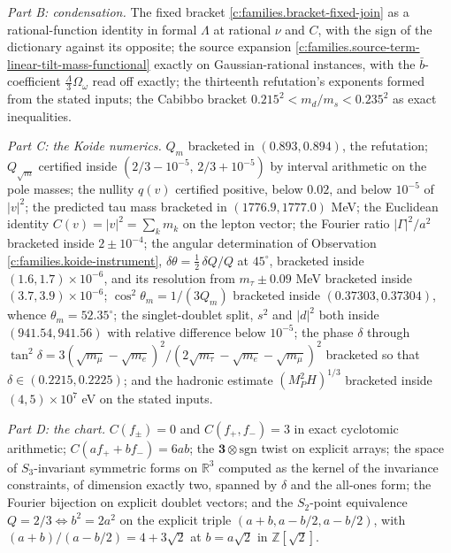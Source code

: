 \documentclass[11pt]{article}
\theoremstyle{definition}
\theoremstyle{plain}
\providecommand{\R}{}\renewcommand{\R}{\mathbb{R}}
\begin{document}
\emph{Part B: condensation.} The fixed bracket \ref{c:families.bracket-fixed-join} as a rational-function identity in formal $\Lambda$ at rational $\nu$ and $C$, with the sign of the dictionary against its opposite; the source expansion \ref{c:families.source-term-linear-tilt-mass-functional} exactly on Gaussian-rational instances, with the $\bar b$-coefficient $\tfrac{\Lambda}{3}\Omega_{\omega}$ read off exactly; the thirteenth refutation's exponents formed from the stated inputs; the Cabibbo bracket $0.215^{2} < m_{d}/m_{s} < 0.235^{2}$ as exact inequalities.

\emph{Part C: the Koide numerics.} $Q_{m}$ bracketed in $(0.893, 0.894)$, the refutation; $Q_{\sqrt{m}}$ certified inside $(2/3 - 10^{-5},\, 2/3 + 10^{-5})$ by interval arithmetic on the pole masses; the nullity $q(v)$ certified positive, below $0.02$, and below $10^{-5}$ of $|v|^{2}$; the predicted tau mass bracketed in $(1776.9, 1777.0)$ MeV; the Euclidean identity $C(v) = |v|^{2} = \sum_{k}m_{k}$ on the lepton vector; the Fourier ratio $|\Gamma|^{2}/a^{2}$ bracketed inside $2 \pm 10^{-4}$; the angular determination of Observation \ref{c:families.koide-instrument}, $\delta\theta = \tfrac12\,\delta Q/Q$ at $45^{\circ}$, bracketed inside $(1.6, 1.7) \times 10^{-6}$, and its resolution from $m_{\tau} \pm 0.09$ MeV bracketed inside $(3.7, 3.9) \times 10^{-6}$; $\cos^{2}\theta_{m} = 1/(3Q_{m})$ bracketed inside $(0.37303, 0.37304)$, whence $\theta_{m} = 52.35^{\circ}$; the singlet-doublet split, $s^{2}$ and $|d|^{2}$ both inside $(941.54, 941.56)$ with relative difference below $10^{-5}$; the phase $\delta$ through $\tan^{2}\delta = 3(\sqrt{m_{\mu}} - \sqrt{m_{e}})^{2}/(2\sqrt{m_{\tau}} - \sqrt{m_{e}} - \sqrt{m_{\mu}})^{2}$ bracketed so that $\delta \in (0.2215, 0.2225)$; and the hadronic estimate $(M_{P}^{2}H)^{1/3}$ bracketed inside $(4, 5) \times 10^{7}$ eV on the stated inputs.

\emph{Part D: the chart.} $C(f_{\pm}) = 0$ and $C(f_{+}, f_{-}) = 3$ in exact cyclotomic arithmetic; $C(af_{+} + bf_{-}) = 6ab$; the $\mathbf{3} \otimes \mathrm{sgn}$ twist on explicit arrays; the space of $S_{3}$-invariant symmetric forms on $\R^{3}$ computed as the kernel of the invariance constraints, of dimension exactly two, spanned by $\delta$ and the all-ones form; the Fourier bijection on explicit doublet vectors; and the $S_{2}$-point equivalence $Q = 2/3 \iff b^{2} = 2a^{2}$ on the explicit triple $(a+b, a-b/2, a-b/2)$, with $(a+b)/(a-b/2) = 4 + 3\sqrt{2}$ at $b = a\sqrt{2}$ in $\mathbb{Z}[\sqrt{2}]$.
\end{document}
